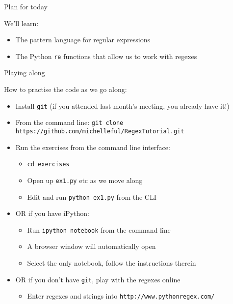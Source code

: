 \documentclass{beamer}
\begin{document}
\begin{frame}{Plan for today}

We'll learn:
\begin{itemize}
 \item The pattern language for regular expressions
 \item The Python \lstinline$re$ functions that allow us to work with regexes
\end{itemize}

\end{frame}

\begin{frame}{Playing along}

How to practise the code as we go along:
\begin{itemize}
 \item Install \lstinline$git$ (if you attended last month's meeting, you already have it!)
 \item From the command line: \lstinline$git clone https://github.com/michelleful/RegexTutorial.git$
 \item Run the exercises from the command line interface:
 \begin{itemize}
   \item \lstinline$cd exercises$
   \item Open up \lstinline$ex1.py$ etc as we move along
   \item Edit and run \lstinline$python ex1.py$ from the CLI
 \end{itemize}
 \item OR if you have iPython:
   \begin{itemize}
    \item Run \lstinline$ipython notebook$ from the command line
    \item A browser window will automatically open
    \item Select the only notebook, follow the instructions therein
   \end{itemize}
 \item OR if you don't have \lstinline$git$, play with the regexes online
   \begin{itemize}
    \item Enter regexes and strings into \lstinline$http://www.pythonregex.com/$
   \end{itemize}
\end{itemize}

\end{frame}
\end{document}
